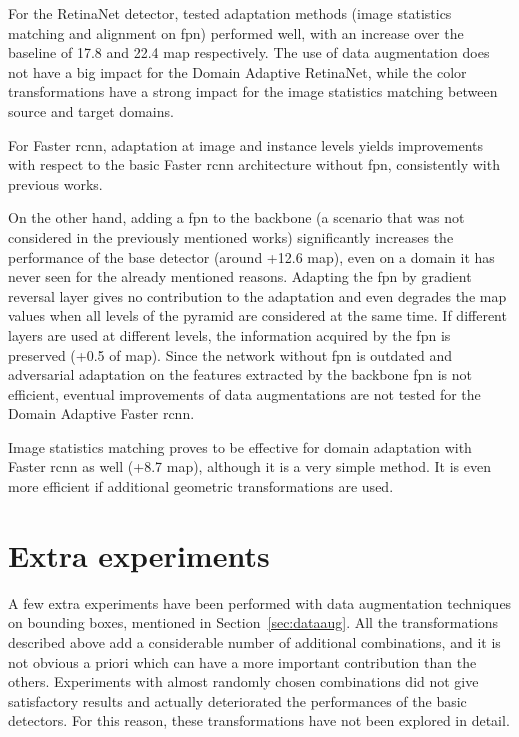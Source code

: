 \documentclass[%
    corpo=12pt,
    twoside,
    stile=classica,   
    tipotesi=magistrale,
    evenboxes,
    english,
	numerazioneromana,
]{toptesi}
\begin{document}
\bigskip
For the RetinaNet detector, tested adaptation methods (image statistics matching and alignment on \gls{fpn}) performed well, with an increase over the baseline of 17.8 and 22.4 \gls{map} respectively. The use of data augmentation does not have a big impact for the Domain Adaptive RetinaNet, while the color transformations have a strong impact for the image statistics matching between source and target domains.

\bigskip
For Faster \gls{rcnn}, adaptation at image and instance levels yields improvements with respect to the basic Faster \gls{rcnn} architecture without \gls{fpn}, consistently with previous works\cite{abramov2020simple}\cite{chen2018domain}\cite{saito2017asymmetric}.

On the other hand, adding a \gls{fpn} to the backbone (a scenario that was not considered in the previously mentioned works) significantly increases the performance of the base detector (around +12.6 \acrshort{map}), even on a domain it has never seen for the already mentioned reasons. Adapting the \gls{fpn} by gradient reversal layer gives no contribution to the adaptation and even degrades the \gls{map} values when all levels of the pyramid are considered at the same time. If different layers are used at different levels, the information acquired by the \gls{fpn} is preserved (+0.5 of \gls{map}). Since the network without \gls{fpn} is outdated and adversarial adaptation on the features extracted by the backbone \gls{fpn} is not efficient, eventual improvements of data augmentations are not tested for the Domain Adaptive Faster \gls{rcnn}.

Image statistics matching proves to be effective for domain adaptation with Faster \gls{rcnn} as well (+8.7 \gls{map}), although it is a very simple method. It is even more efficient if additional geometric transformations are used.

\section{Extra experiments}
A few extra experiments have been performed with data augmentation techniques on bounding boxes, mentioned in Section~\ref{sec:dataaug}. All the transformations described above add a considerable number of additional combinations, and it is not obvious a priori which can have a more important contribution than the others. Experiments with almost randomly chosen combinations did not give satisfactory results and actually deteriorated the performances of the basic detectors. For this reason, these transformations have not been explored in detail.
\end{document}
